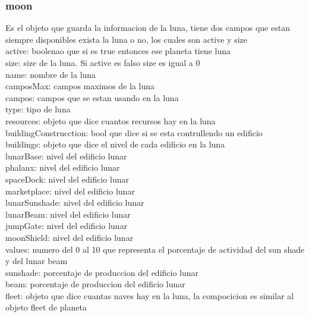 \documentclass{article}
\newcommand\tab[1][1cm]{\hspace*{#1}}
\begin{document}
        \subsubsection{moon} Es el objeto que guarda la informacion de la luna, tiene dos campos que estan siempre disponibles exista la luna o no, los cuales son active y size\\
            \tab active: boolenao que si es true entonces ese planeta tiene luna\\
            \tab size: size de la luna. Si active es falso size es igual a 0\\
            \tab name: nombre de la luna\\
            \tab camposMax: campos maximos de la luna\\
            \tab campos: campos que se estan usando en la luna\\
            \tab type: tipo de luna\\
            \tab resources: objeto que dice cuantos recursos hay en la luna\\
            \tab buildingConstrucction: bool que dice si se esta contrullendo un edificio\\
            \tab buildings: objeto que dice el nivel de cada edificio en la luna\\
            \tab\tab lunarBase: nivel del edificio lunar\\
            \tab\tab phalanx: nivel del edificio lunar\\
            \tab\tab spaceDock: nivel del edificio lunar\\
            \tab\tab marketplace: nivel del edificio lunar\\
            \tab\tab lunarSunshade: nivel del edificio lunar\\
            \tab\tab lunarBeam: nivel del edificio lunar\\
            \tab\tab jumpGate: nivel del edificio lunar\\
            \tab\tab moonShield: nivel del edificio lunar\\
            \tab values: numero del 0 al 10 que representa el porcentaje de actividad del sun shade y del lunar beam\\
            \tab\tab sunshade: porcentaje de produccion del edificio lunar\\
            \tab\tab beam: porcentaje de produccion del edificio lunar\\
            \tab fleet: objeto que dice cuantas naves hay en la luna, la compocicion es similar al objeto fleet de planeta\\
\end{document}
